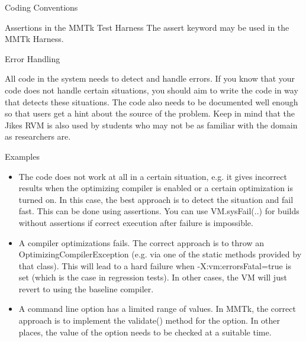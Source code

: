 \begin{section}{Coding Conventions}
\begin{subsection}{Assertions in the MMTk Test Harness}
The assert keyword may be used in the MMTk Harness.

\end{subsection}

\begin{subsection}{Error Handling}

All code in the system needs to detect and handle errors. If you know that your code does not handle certain situations, you should aim to write the code in way that detects these situations. The code also needs to be documented well enough so that users get a hint about the source of the problem. Keep in mind that the Jikes RVM is also used by students who may not be as familiar with the domain as researchers are.

\begin{subsubsection}{Examples}
  \begin{itemize}
    \item The code does not work at all in a certain situation, e.g. it gives incorrect results when the optimizing compiler is enabled or a certain optimization is turned on. In this case, the best approach is to detect the situation and fail fast. This can be done using assertions. You can use VM.sysFail(..) for builds without assertions if correct execution after failure is impossible.
    \item A compiler optimizations fails. The correct approach is to throw an OptimizingCompilerException (e.g. via one of the static methods provided by that class). This will lead to a hard failure when -X:vm:errorsFatal=true is set (which is the case in regression tests). In other cases, the VM will just revert to using the baseline compiler.
    \item A command line option has a limited range of values. In MMTk, the correct approach is to implement the validate() method for the option. In other places, the value of the option needs to be checked at a suitable time.
  \end{itemize}
\end{subsubsection}

\end{subsection}
 

\end{section}
